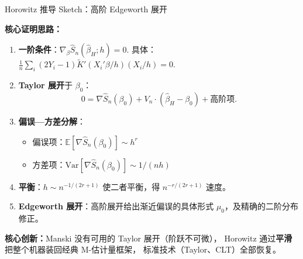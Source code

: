 \documentclass[aspectratio=169, 10pt]{beamer}
\begin{document}
\begin{frame}{Horowitz 推导 Sketch：高阶 Edgeworth 展开}

  \textbf{核心证明思路：}

  \begin{enumerate}\setlength{\itemsep}{2pt}
    \item \textbf{一阶条件}：$\nabla_\beta \hat S_n(\hat\beta_H; h) = 0$.
    具体：$\frac{1}{n}\sum_i (2Y_i - 1) \tilde K'\!(X_i'\beta/h) (X_i/h) = 0$.

    \item \textbf{Taylor 展开}于 $\beta_0$：
    $$0 = \nabla \hat S_n(\beta_0) + V_n \cdot (\hat\beta_H - \beta_0) + \text{高阶项}.$$

    \item \textbf{偏误—方差分解}：
    \begin{itemize}\setlength{\itemsep}{1pt}
      \item 偏误项：$\mathbb{E}[\nabla \hat S_n(\beta_0)] \sim h^r$
      \item 方差项：$\text{Var}[\nabla \hat S_n(\beta_0)] \sim 1/(nh)$
    \end{itemize}

    \item \textbf{平衡}：$h \sim n^{-1/(2r+1)}$ 使二者平衡，得 $n^{-r/(2r+1)}$ 速度。

    \item \textbf{Edgeworth 展开}：高阶展开给出渐近偏误的具体形式 $\mu_0$，及精确的二阶分布修正。
  \end{enumerate}

  \begin{highlightbox}
    \textbf{核心创新：}Manski 没有可用的 Taylor 展开（阶跃不可微），
    Horowitz 通过\textbf{平滑}把整个机器装回经典 M-估计量框架，
    标准技术（Taylor、CLT）全部恢复。
  \end{highlightbox}

  \hypertarget{main-c17}{}
  \hfill{\scriptsize\hyperlink{proof-c17}{}}

\end{frame}
\end{document}
